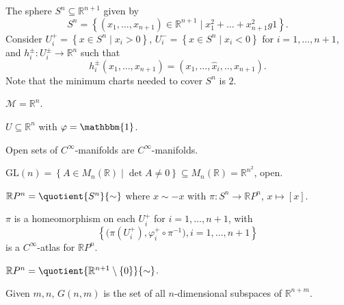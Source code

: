 \begin{eg}[Sphere]
	The sphere \(S^n \subseteq \mathbb{R} ^{n+1}\) given by
	\[
		S^n = \left\{ (x_1, \ldots , x_{n+1} )\in \mathbb{R} ^{n+1} \mid x_1^2 + \ldots + x_{n+1}^2 g 1 \right\}.
	\]
	Consider \(U_i^+ = \left\{ x\in S^n \mid x_i > 0 \right\} \), \(U_i^-=\left\{ x\in S^n \mid x_i < 0 \right\} \) for \(i = 1, \ldots , n+1\), and \(h_i^{\pm} \colon U_i^{\pm} \to \mathbb{R} ^n\) such that
	\[
		h_i^{\pm}(x_1, \ldots , x_{n+1}) = (x_1, \ldots , \hat{x} _i, .., x_{n+1}).
	\]
	Note that the minimum charts needed to cover \(S^n\) is \(2\).
\end{eg}

\begin{eg}
	\(\mathcal{M} =\mathbb{R} ^n\).
\end{eg}

\begin{eg}
	\(U \subseteq \mathbb{R} ^n\) with \(\varphi = \mathbbm{1}\).
\end{eg}

\begin{eg}
	Open sets of \(C^{\infty} \)-manifolds are \(C^{\infty}\)-manifolds.
\end{eg}

\begin{eg}
	\(\mathrm{GL} (n) = \left\{ A\in M_n(\mathbb{R} ) \mid \det A \neq 0 \right\} \subseteq M_n(\mathbb{R} ) = \mathbb{R} ^{n^2}\), open.
\end{eg}

\begin{eg}
	\(\mathbb{R} P^n = \quotient{S^n}{\sim } \) where \(x \sim -x\) with \(\pi \colon S^n \to \mathbb{R} P^n\), \(x \mapsto [x]\).
\end{eg}
\begin{explanation}
	\(\pi \) is a homeomorphism on each \(U_i^+\) for \(i=1, \ldots , n+1\), with
	\[
		\left\{ \big( \pi (U_i^+), \varphi _i^+ \circ \pi ^{-1}  \big), i=1, \ldots , n+1 \right\}
	\]
	is a \(C^{\infty} \)-atlas for \(\mathbb{R} P^n\).
\end{explanation}

\begin{note}
	\(\mathbb{R} P^n = \quotient{\mathbb{R} ^{n+1} \setminus \left\{ 0 \right\} }{\sim } \).
\end{note}

\begin{eg}
	Given \(m, n\), \(G(n, m)\) is the set of all \(n\)-dimensional subspaces of \(\mathbb{R} ^{n+m}\).
\end{eg}